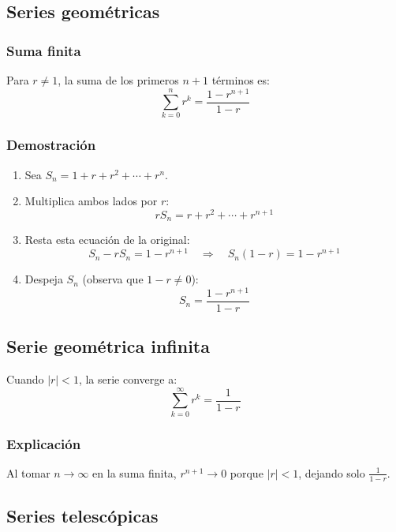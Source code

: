 \documentclass[letterpaper, 12pt]{article}
\begin{document}
	\subsection{Series geométricas}
	
	\subsubsection{Suma finita}
	
	Para $r \neq 1$, la suma de los primeros $n+1$ términos es:
	\[
	\sum_{k=0}^n r^k = \frac{1 - r^{n+1}}{1 - r}
	\]
	
	\subsubsection{Demostración}
	
	\begin{enumerate}
		\item Sea $S_n = 1 + r + r^2 + \cdots + r^n$.
		
		\item Multiplica ambos lados por $r$:
		\[
		rS_n = r + r^2 + \cdots + r^{n+1}
		\]
		
		\item Resta esta ecuación de la original:
		\[
		S_n - rS_n = 1 - r^{n+1} \quad \Rightarrow \quad S_n(1 - r) = 1 - r^{n+1}
		\]
		
		\item Despeja $S_n$ (observa que $1-r \neq 0$):
		\[
		S_n = \frac{1 - r^{n+1}}{1 - r}
		\]
	\end{enumerate}
	
	\subsection{Serie geométrica infinita}
	
	Cuando $|r| < 1$, la serie converge a:
	\[
	\sum_{k=0}^\infty r^k = \frac{1}{1 - r}
	\]
	
	\subsubsection{Explicación}
	Al tomar $n \to \infty$ en la suma finita, $r^{n+1} \to 0$ porque $|r| < 1$, dejando solo $\frac{1}{1-r}$.
	
	\subsection{Series telescópicas}
	
\end{document}
